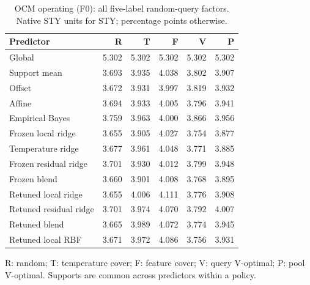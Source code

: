\begin{table}[htbp]\centering\small
\caption{OCM operating (F0): all five-label random-query factors. Native STY units for STY; percentage points otherwise.}
\begin{tabular}{lrrrrr}\toprule Predictor & R & T & F & V & P\\\midrule
Global & 5.302 & 5.302 & 5.302 & 5.302 & 5.302\\
Support mean & 3.693 & 3.935 & 4.038 & 3.802 & 3.907\\
Offset & 3.672 & 3.931 & 3.997 & 3.819 & 3.932\\
Affine & 3.694 & 3.933 & 4.005 & 3.796 & 3.941\\
Empirical Bayes & 3.759 & 3.963 & 4.000 & 3.866 & 3.956\\
Frozen local ridge & 3.655 & 3.905 & 4.027 & 3.754 & 3.877\\
Temperature ridge & 3.677 & 3.961 & 4.048 & 3.771 & 3.885\\
Frozen residual ridge & 3.701 & 3.930 & 4.012 & 3.799 & 3.948\\
Frozen blend & 3.660 & 3.901 & 4.008 & 3.768 & 3.895\\
Retuned local ridge & 3.655 & 4.006 & 4.111 & 3.776 & 3.908\\
Retuned residual ridge & 3.701 & 3.974 & 4.070 & 3.792 & 4.007\\
Retuned blend & 3.665 & 3.989 & 4.072 & 3.774 & 3.945\\
Retuned local RBF & 3.671 & 3.972 & 4.086 & 3.756 & 3.931\\
\bottomrule\end{tabular}\par\smallskip\footnotesize R: random; T: temperature cover; F: feature cover; V: query V-optimal; P: pool V-optimal. Supports are common across predictors within a policy.\end{table}\FloatBarrier
